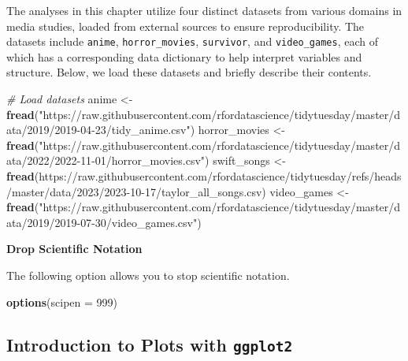 \documentclass[
]{book}
\newenvironment{Shaded}{\begin{snugshade}}{\end{snugshade}}
\newcommand{\AttributeTok}[1]{\textcolor[rgb]{0.13,0.29,0.53}{#1}}
\newcommand{\CommentTok}[1]{\textcolor[rgb]{0.56,0.35,0.01}{\textit{#1}}}
\newcommand{\DecValTok}[1]{\textcolor[rgb]{0.00,0.00,0.81}{#1}}
\newcommand{\FunctionTok}[1]{\textcolor[rgb]{0.13,0.29,0.53}{\textbf{#1}}}
\newcommand{\NormalTok}[1]{#1}
\newcommand{\OtherTok}[1]{\textcolor[rgb]{0.56,0.35,0.01}{#1}}
\newcommand{\StringTok}[1]{\textcolor[rgb]{0.31,0.60,0.02}{#1}}
\begin{document}
The analyses in this chapter utilize four distinct datasets from various domains in media studies, loaded from external sources to ensure reproducibility. The datasets include \texttt{anime}, \texttt{horror\_movies}, \texttt{survivor}, and \texttt{video\_games}, each of which has a corresponding data dictionary to help interpret variables and structure. Below, we load these datasets and briefly describe their contents.

\begin{Shaded}
\begin{Highlighting}[]
\CommentTok{\# Load datasets}
\NormalTok{anime }\OtherTok{\textless{}{-}} \FunctionTok{fread}\NormalTok{(}\StringTok{"https://raw.githubusercontent.com/rfordatascience/tidytuesday/master/data/2019/2019{-}04{-}23/tidy\_anime.csv"}\NormalTok{)}
\NormalTok{horror\_movies }\OtherTok{\textless{}{-}} \FunctionTok{fread}\NormalTok{(}\StringTok{"https://raw.githubusercontent.com/rfordatascience/tidytuesday/master/data/2022/2022{-}11{-}01/horror\_movies.csv"}\NormalTok{)}
\NormalTok{swift\_songs }\OtherTok{\textless{}{-}} \FunctionTok{fread}\NormalTok{(}\StringTok{\textquotesingle{}https://raw.githubusercontent.com/rfordatascience/tidytuesday/refs/heads/master/data/2023/2023{-}10{-}17/taylor\_all\_songs.csv\textquotesingle{}}\NormalTok{)}
\NormalTok{video\_games }\OtherTok{\textless{}{-}} \FunctionTok{fread}\NormalTok{(}\StringTok{"https://raw.githubusercontent.com/rfordatascience/tidytuesday/master/data/2019/2019{-}07{-}30/video\_games.csv"}\NormalTok{)}
\end{Highlighting}
\end{Shaded}

\textbf{Drop Scientific Notation}

The following option allows you to stop scientific notation.

\begin{Shaded}
\begin{Highlighting}[]
\FunctionTok{options}\NormalTok{(}\AttributeTok{scipen =} \DecValTok{999}\NormalTok{) }
\end{Highlighting}
\end{Shaded}

\subsection*{\texorpdfstring{Introduction to Plots with \texttt{ggplot2}}{Introduction to Plots with ggplot2}}\label{introduction-to-plots-with-ggplot2}
\end{document}
